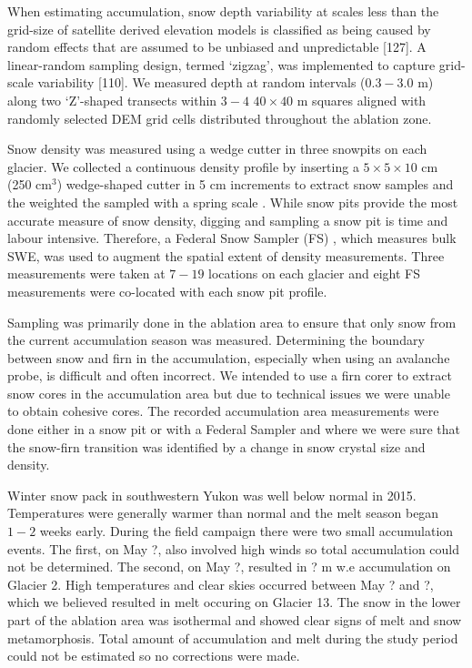 \documentclass[twoside,twocolumn]{article}
\begin{document}
When estimating accumulation, snow depth variability at scales less than the grid-size of satellite derived elevation models is classified as being caused by random effects that are assumed to be unbiased and unpredictable [127]. A linear-random sampling design, termed `zigzag', was implemented to capture grid-scale variability [110]. We measured depth at random intervals ($0.3 - 3.0$ m) along two `Z'-shaped transects within $3-4$ $40\times40$ m squares aligned with randomly selected DEM grid cells distributed throughout the ablation zone.

Snow density was measured using a wedge cutter in three snowpits on each glacier. We collected a continuous density profile by inserting a $5\times5\times 10$ cm (250 cm$^3$) wedge-shaped cutter in 5 cm increments to extract snow samples and the weighted the sampled with a spring scale \citep{Gray1981,Firez2009}. While snow pits provide the most accurate measure of snow density, digging and sampling a snow pit is time and labour intensive. Therefore, a Federal Snow Sampler (FS) \citep{Clyde1932}, which measures bulk SWE, was used to augment the spatial extent of density measurements. Three measurements were taken at $7-19$ locations on each glacier and eight FS measurements were co-located with each snow pit profile.

Sampling was primarily done in the ablation area to ensure that only snow from the current accumulation season was measured. Determining the boundary between snow and firn in the accumulation, especially when using an avalanche probe, is difficult and often incorrect. We intended to use a firn corer to extract snow cores in the accumulation area but due to technical issues we were unable to obtain cohesive cores. The recorded accumulation area measurements were done either in a snow pit or with a Federal Sampler and where we were sure that the snow-firn transition was identified by a change in snow crystal size and density. 

Winter snow pack in southwestern Yukon was well below normal in 2015. Temperatures were generally warmer than normal and the melt season began $1-2$ weeks early. During the field campaign there were two small accumulation events. The first, on May ?, also involved high winds so total accumulation could not be determined. The second, on May ?, resulted in ? m w.e accumulation on Glacier 2. High temperatures and clear skies occurred between May ? and ?, which we believed resulted in melt occuring on Glacier 13. The snow in the lower part of the ablation area was isothermal and showed clear signs of melt and snow metamorphosis. Total amount of accumulation and melt during the study period could not be estimated so no corrections were made.
\end{document}
